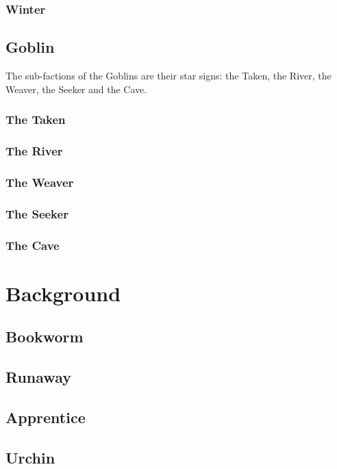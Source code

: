 \documentclass{report}
\begin{document}
\subsubsection{Winter}


\subsection{Goblin}
The sub-factions of the Goblins are their star signs: the Taken, the River, the Weaver, the Seeker and the Cave.

\subsubsection{The Taken}

\subsubsection{The River}

\subsubsection{The Weaver}

\subsubsection{The Seeker}

\subsubsection{The Cave}


\section{Background}
\subsection{Bookworm}
\subsection{Runaway}
\subsection{Apprentice}
\subsection{Urchin}
\end{document}
